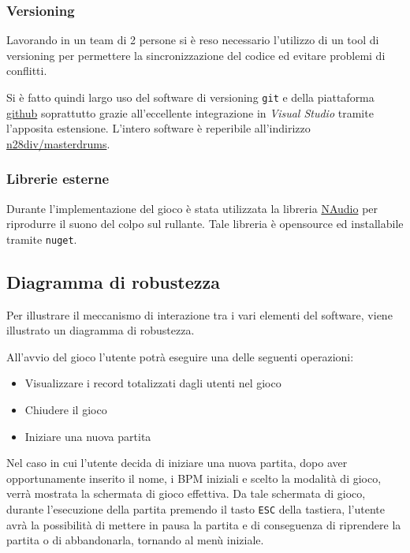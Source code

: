 \subsubsection{Versioning}
Lavorando in un team di 2 persone si è reso necessario l'utilizzo di un tool di versioning per permettere la sincronizzazione del codice ed evitare problemi di conflitti.

Si è fatto quindi largo uso del software di versioning \texttt{git} e della piattaforma \hyperlink{https://github.com}{github} soprattutto grazie all'eccellente integrazione in \emph{Visual Studio} tramite l'apposita estensione.
L'intero software è reperibile all'indirizzo \hyperlink{https://github.com/n28div/masterdrums}{n28div/masterdrums}.

\subsubsection{Librerie esterne}
Durante l'implementazione del gioco è stata utilizzata la libreria \hyperlink{https://github.com/naudio/NAudio}{NAudio} per riprodurre il suono del colpo sul rullante.
Tale libreria è opensource ed installabile tramite \texttt{nuget}.
\newpage
\subsection{Diagramma di robustezza}
Per illustrare il meccanismo di interazione tra i vari elementi del software, viene illustrato un diagramma di robustezza.

\vspace{1cm}
\begin{figure}[h]
\end{figure}
\vspace{1.5cm}
All'avvio del gioco l'utente potrà eseguire una delle seguenti operazioni:
\begin{itemize}
    \item Visualizzare i record totalizzati dagli utenti nel gioco
    \item Chiudere il gioco
    \item Iniziare una nuova partita
\end{itemize}
\vspace{1cm}
Nel caso in cui l'utente decida di iniziare una nuova partita, dopo aver opportunamente inserito il nome, i BPM iniziali e scelto la modalità di gioco, verrà mostrata la schermata di gioco effettiva. Da tale schermata di gioco, durante l'esecuzione della partita premendo il tasto \texttt{ESC} della tastiera, l'utente avrà la possibilità di mettere in pausa la partita e di conseguenza di riprendere la partita o di abbandonarla, tornando al menù iniziale.

